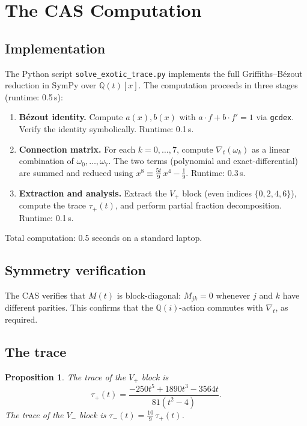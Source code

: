 \documentclass[11pt]{article}
\theoremstyle{plain}
\newtheorem{proposition}[theorem]{Proposition}
\theoremstyle{definition}
\theoremstyle{remark}
\newcommand{\Q}{\mathbb{Q}}
\begin{document}
\section{The CAS Computation}

\subsection{Implementation}

The Python script \texttt{solve\_exotic\_trace.py}
implements the full Griffiths--B\'ezout reduction
in SymPy over $\Q(t)[x]$.
The computation proceeds in three stages (runtime: 0.5\,s):

\begin{enumerate}[nosep]
\item \textbf{B\'ezout identity.} Compute $a(x), b(x)$ with
  $a \cdot f + b \cdot f' = 1$ via \texttt{gcdex}. Verify the identity
  symbolically. Runtime: 0.1\,s.
\item \textbf{Connection matrix.} For each $k = 0, \ldots, 7$, compute
  $\nabla_t(\omega_k)$ as a linear combination of $\omega_0, \ldots, \omega_7$.
  The two terms (polynomial and exact-differential) are summed and reduced
  using $x^8 \equiv \tfrac{5t}{9}\, x^4 - \tfrac{1}{9}$. Runtime: 0.3\,s.
\item \textbf{Extraction and analysis.} Extract the $V_+$ block (even
  indices $\{0,2,4,6\}$), compute the trace $\tau_+(t)$, and perform
  partial fraction decomposition. Runtime: 0.1\,s.
\end{enumerate}

Total computation: 0.5 seconds on a standard laptop.

\subsection{Symmetry verification}

The CAS verifies that $M(t)$ is block-diagonal: $M_{jk} = 0$ whenever $j$
and $k$ have different parities. This confirms that the $\Q(i)$-action
commutes with $\nabla_t$, as required.

\subsection{The trace}

\begin{proposition}\label{prop:trace}
The trace of the $V_+$ block is
\[
\tau_+(t) = \frac{-250t^5 + 1890t^3 - 3564t}{81(t^2 - 4)}.
\]
The trace of the $V_-$ block is $\tau_-(t) = \tfrac{10}{9}\, \tau_+(t)$.
\end{proposition}
\end{document}

